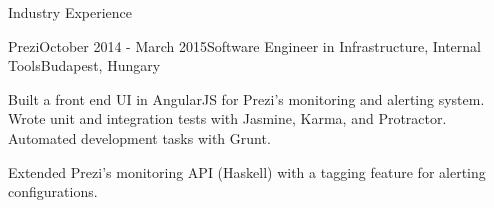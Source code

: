 \documentclass{resume} %
\begin{document}
\begin{rSection}{Industry Experience}
\begin{rSubsection}{Prezi}{October 2014 - March 2015}{Software Engineer in Infrastructure, Internal Tools}{Budapest, Hungary}
\item Built a front end UI in AngularJS for Prezi's monitoring and alerting system. Wrote unit and integration tests with Jasmine, Karma, and Protractor. Automated development tasks with Grunt.
\item Extended Prezi's monitoring API (Haskell) with a tagging feature for alerting configurations.
\end{rSubsection}



\end{rSection}

\end{document}
